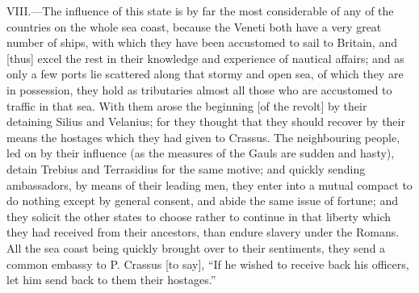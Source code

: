 VIII.—The influence of this state is by far the most considerable of
any of the countries on the whole sea coast, because the Veneti both
have a very great number of ships, with which they have been accustomed
to sail to Britain, and [thus] excel the rest in their knowledge and
experience of nautical affairs; and as only a few ports lie scattered
along that stormy and open sea, of which they are in possession, they
hold as tributaries almost all those who are accustomed to traffic in
that sea. With them arose the beginning [of the revolt] by their
detaining Silius and Velanius; for they thought that they should recover
by their means the hostages which they had given to Crassus. The
neighbouring people, led on by their influence (as the measures of the
Gauls are sudden and hasty), detain Trebius and Terrasidius for the same
motive; and quickly sending ambassadors, by means of their leading men,
they enter into a mutual compact to do nothing except by general
consent, and abide the same issue of fortune; and they solicit the other
states to choose rather to continue in that liberty which they had
received from their ancestors, than endure slavery under the Romans. All
the sea coast being quickly brought over to their sentiments, they send
a common embassy to P. Crassus [to say], ``If he wished to receive back
his officers, let him send back to them their hostages.''

